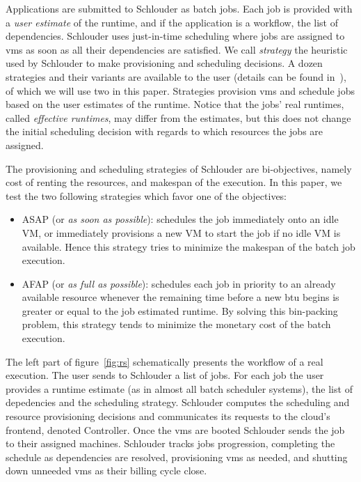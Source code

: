 \documentclass[10pt,conference,compsocconf]{IEEEtran}
\begin{document}
Applications are submitted to Schlouder as batch jobs. Each job is provided with
a \emph{user estimate} of the runtime, and if the application is a workflow, the
list  of dependencies.  Schlouder uses  just-in-time scheduling  where jobs  are
assigned to \acp{vm}  as soon as all their dependencies  are satisfied.  We call
\emph{strategy}  the  heuristic  used  by Schlouder  to  make  provisioning  and
scheduling decisions.   A dozen strategies  and their variants are  available to
the user (details can be found in~\cite{GenaudG11}), of which we will use two in
this paper.  Strategies provision \acp{vm} and  schedule jobs based on  the user
estimates  of  the  runtime.  Notice   that  the  jobs'  real  runtimes,  called
\emph{effective  runtimes}, may  differ from  the estimates,  but this  does not
change the initial scheduling decision with  regards to which resources the jobs
are assigned.

The  provisioning  and scheduling  strategies  of  Schlouder are  bi-objectives,
namely cost  of renting the  resources, and makespan  of the execution.  In this
paper, we test the two following strategies which favor one of the objectives: 
\begin{itemize}
\item ASAP (or \textit{as soon as possible}): schedules the job immediately onto
  an idle VM, or immediately provisions a new  VM to start the job if no idle VM
  is available.  Hence this strategy tries to minimize the makespan of the batch
  job execution.

\item AFAP (or \textit{as full as  possible}): schedules each job in priority to
	an already available resource whenever the remaining time  before a new
	\ac{btu} begins is greater or equal to the job estimated runtime.
	By solving this bin-packing problem, this strategy tends to minimize the
	monetary cost of the batch execution.
\end{itemize}

The left  part of figure~\ref{fig:rs}  schematically presents the workflow  of a
real execution.  The  user sends to Schlouder  a list of jobs. For  each job the
user provides a runtime estimate (as in almost all batch scheduler systems), the
list  of  depedencies  and  the scheduling  strategy.   Schlouder  computes  the
scheduling and resource provisioning decisions  and communicates its requests to
the  cloud's  frontend,  denoted  Controller.   Once  the  \acp{vm}  are  booted
Schlouder  sends the  job to  their  assigned machines.   Schlouder tracks  jobs
progression, completing the schedule  as dependencies are resolved, provisioning
\acp{vm} as needed,  and shutting down unneeded \acp{vm} as  their billing cycle
close.
\end{document}
